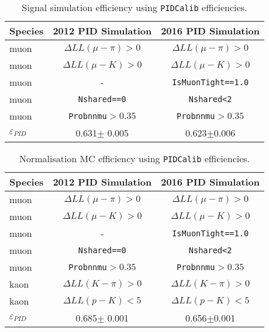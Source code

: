 \begin{table}[H]
\begin{center}
\begin{tabular}{l c c}\toprule

    Species  & 2012 PID Simulation & 2016 PID Simulation\\ \hline
    muon &  $\Delta LL(\mu - \pi) > 0$ & $\Delta LL(\mu - \pi) > 0$ \\
    muon &  $\Delta LL(\mu - K) > 0$ & $\Delta LL(\mu - K) > 0$ \\
    muon &   - & \texttt{IsMuonTight==1.0}\\
    muon &  \texttt{Nshared==0} & \texttt{Nshared<2} \\
	muon &  \texttt{Probnnmu}$>0.35$ & \texttt{Probnnmu}$>0.35$ \\
     \hline
   $\varepsilon_{PID}$   & 0.631$\pm$ 0.005 & 0.623$\pm$0.006 \\

     \bottomrule
      \end{tabular}
\end{center}
\caption{Signal simulation efficiency using \texttt{PIDCalib} efficiencies.}
\label{tab:PIDselection}
\end{table}

\begin{table}[H]
\begin{center}
\begin{tabular}{l c c}\toprule

    Species  &2012 PID Simulation & 2016 PID Simulation\\ \hline
    muon &  $\Delta LL(\mu - \pi) > 0$ & $\Delta LL(\mu - \pi) > 0$ \\
    muon & $\Delta LL(\mu - K) > 0$ & $\Delta LL(\mu - K) > 0$ \\
    muon &  - & \texttt{IsMuonTight==1.0}\\
    muon & \texttt{Nshared==0} & \texttt{Nshared<2} \\
    muon & \texttt{Probnnmu}$>0.35$ & \texttt{Probnnmu}$>0.35$ \\
    kaon &  $\Delta LL(K - \pi) > 0$ & $\Delta LL(K - \pi) > 0$ \\
    kaon &  $\Delta LL(p - K) < 5$ & $\Delta LL(p - K) < 5$ \\
     \hline
    $\varepsilon_{PID}$ &0.685$\pm$ 0.001 & 0.656$\pm$0.001  \\

     \bottomrule
      \end{tabular}

\end{center}
\caption{Normalisation MC efficiency using \texttt{PIDCalib} efficiencies.}
\label{tab:PIDselectionNorm}
\end{table}


